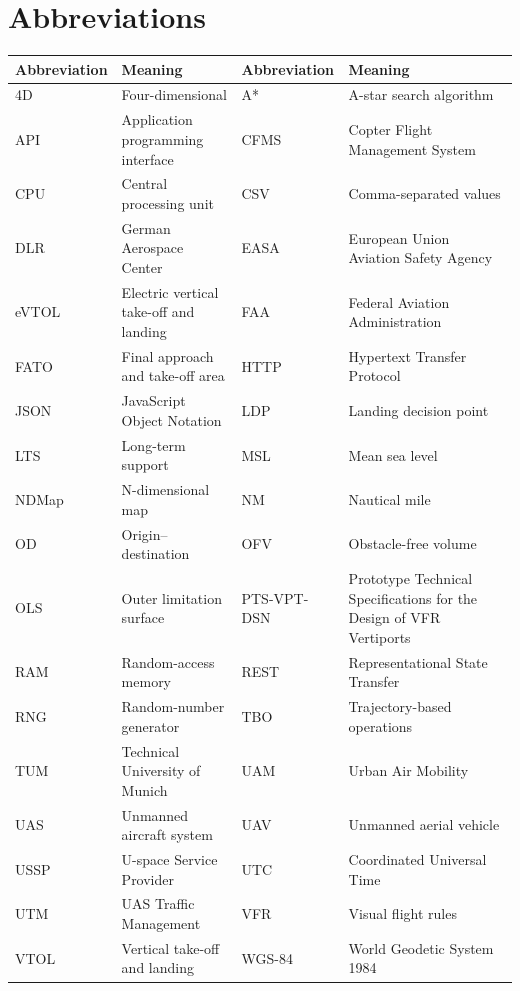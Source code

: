 \section*{Abbreviations}

\vspace{-0.6em}
\begingroup
\footnotesize
\renewcommand{\arraystretch}{0.88}
\begin{tabularx}{\textwidth}{lXlX}
    \toprule
    Abbreviation & Meaning & Abbreviation & Meaning \\
    \midrule
    4D & Four-dimensional & A* & A-star search algorithm \\
    API & Application programming interface & CFMS & Copter Flight Management System \\
    CPU & Central processing unit & CSV & Comma-separated values \\
    DLR & German Aerospace Center & EASA & European Union Aviation Safety Agency \\
    eVTOL & Electric vertical take-off and landing & FAA & Federal Aviation Administration \\
    FATO & Final approach and take-off area & HTTP & Hypertext Transfer Protocol \\
    JSON & JavaScript Object Notation & LDP & Landing decision point \\
    LTS & Long-term support & MSL & Mean sea level \\
    NDMap & N-dimensional map & NM & Nautical mile \\
    OD & Origin--destination & OFV & Obstacle-free volume \\
    OLS & Outer limitation surface & PTS-VPT-DSN & Prototype Technical Specifications for the Design of VFR Vertiports \\
    RAM & Random-access memory & REST & Representational State Transfer \\
    RNG & Random-number generator & TBO & Trajectory-based operations \\
    TUM & Technical University of Munich & UAM & Urban Air Mobility \\
    UAS & Unmanned aircraft system & UAV & Unmanned aerial vehicle \\
    USSP & U-space Service Provider & UTC & Coordinated Universal Time \\
    UTM & UAS Traffic Management & VFR & Visual flight rules \\
    VTOL & Vertical take-off and landing & WGS-84 & World Geodetic System 1984 \\
    \bottomrule
\end{tabularx}
\endgroup
